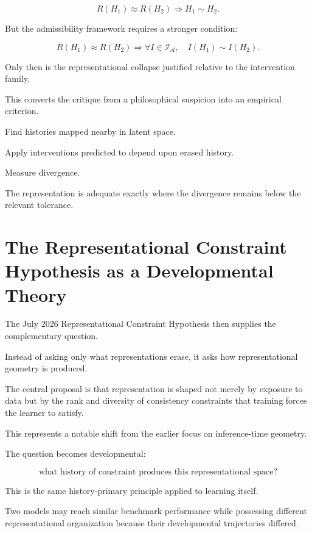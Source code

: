 \documentclass[11pt]{article}
\theoremstyle{remark}
\newcommand{\Adm}{\mathcal{A}}
\begin{document}
\begin{equation}
R(H_1)\approx R(H_2)
\Rightarrow
H_1\sim H_2.
\end{equation}

But the admissibility framework requires a stronger condition:

\begin{equation}
R(H_1)\approx R(H_2)
\Rightarrow
\forall I\in\mathcal{I}_{\Adm},
\quad
I(H_1)\sim I(H_2).
\end{equation}

Only then is the representational collapse justified relative to the intervention family.

This converts the critique from a philosophical suspicion into an empirical criterion.

Find histories mapped nearby in latent space.

Apply interventions predicted to depend upon erased history.

Measure divergence.

The representation is adequate exactly where the divergence remains below the relevant tolerance.

\section{The Representational Constraint Hypothesis as a Developmental Theory}

The July 2026 Representational Constraint Hypothesis then supplies the complementary question.

Instead of asking only what representations erase, it asks how representational geometry is produced.

The central proposal is that representation is shaped not merely by exposure to data but by the rank and diversity of consistency constraints that training forces the learner to satisfy.

This represents a notable shift from the earlier focus on inference-time geometry.

The question becomes developmental:

\begin{equation}
\text{what history of constraint produces this representational space?}
\end{equation}

This is the same history-primary principle applied to learning itself.

Two models may reach similar benchmark performance while possessing different representational organization because their developmental trajectories differed.
\end{document}
